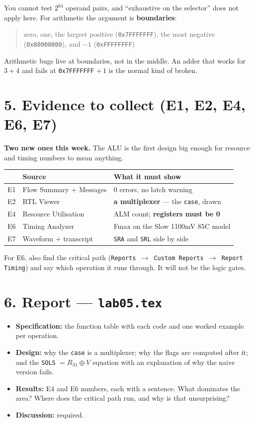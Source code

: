 \documentclass[11pt]{article}
\newcommand{\code}[1]{\texttt{#1}}
\begin{document}
You cannot test $2^{64}$ operand pairs, and ``exhaustive on the selector''
does not apply here. For arithmetic the argument is \textbf{boundaries}:

\begin{quote}
zero, one, the largest positive (\code{0x7FFFFFFF}), the most negative
(\code{0x80000000}), and $-1$ (\code{0xFFFFFFFF})
\end{quote}

Arithmetic bugs live at boundaries, not in the middle. An adder that works for
$3+4$ and fails at \code{0x7FFFFFFF} $+\,1$ is the normal kind of broken.

\section*{5. Evidence to collect (E1, E2, E4, E6, E7)}

\textbf{Two new ones this week.} The ALU is the first design big enough for
resource and timing numbers to mean anything.

\begin{center}
\begin{tabular}{lll}
\toprule
& Source & What it must show \\
\midrule
E1 & Flow Summary + Messages & 0 errors, no latch warning \\
E2 & RTL Viewer & \textbf{a multiplexer} --- the \code{case}, drawn \\
E4 & Resource Utilisation & ALM count; \textbf{registers must be 0} \\
E6 & Timing Analyzer & Fmax on the Slow 1100mV 85C model \\
E7 & Waveform + transcript & \code{SRA} and \code{SRL} side by side \\
\bottomrule
\end{tabular}
\end{center}

For E6, also find the critical path (\code{Reports $\to$ Custom Reports $\to$
Report Timing}) and say which operation it runs through. It will not be the
logic gates.

\section*{6. Report --- \code{lab05.tex}}

\begin{itemize}[leftmargin=1.6em,itemsep=1pt]
\item \textbf{Specification:} the function table with each code and one worked
example per operation.
\item \textbf{Design:} why the \code{case} is a multiplexer; why the flags are
computed after it; and the \code{SOLS} $= R_{31} \oplus V$ equation with an
explanation of why the naive version fails.
\item \textbf{Results:} E4 and E6 numbers, each with a sentence. What dominates
the area? Where does the critical path run, and why is that unsurprising?
\item \textbf{Discussion:} required.
\end{itemize}
\end{document}
